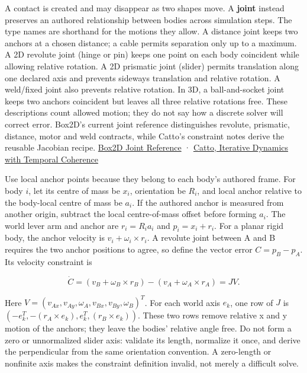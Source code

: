A contact is created and may disappear as two shapes move. A \textbf{joint} instead preserves an authored relationship between bodies across simulation steps. The type names are shorthand for the motions they allow. A distance joint keeps two anchors at a chosen distance; a cable permits separation only up to a maximum. A 2D revolute joint (hinge or pin) keeps one point on each body coincident while allowing relative rotation. A 2D prismatic joint (slider) permits translation along one declared axis and prevents sideways translation and relative rotation. A weld/fixed joint also prevents relative rotation. In 3D, a ball-and-socket joint keeps two anchors coincident but leaves all three relative rotations free. These descriptions count allowed motion; they do not say how a discrete solver will correct error. Box2D's current joint reference distinguishes revolute, prismatic, distance, motor and weld contracts, while Catto's constraint notes derive the reusable Jacobian recipe. \href{https://box2d.org/documentation/group__joint.html}{Box2D Joint Reference} · \href{https://box2d.org/files/ErinCatto_IterativeDynamicsSlides_GDC2005.pdf}{Catto, Iterative Dynamics with Temporal Coherence}

Use local anchor points because they belong to each body's authored frame. For body \(i\), let its centre of mass be \(x_i\), orientation be \(R_i\), and local anchor relative to the body-local centre of mass be \(a_i\). If the authored anchor is measured from another origin, subtract the local centre-of-mass offset before forming \(a_i\). The world lever arm and anchor are \(r_i=R_i a_i\) and \(p_i=x_i+r_i\). For a planar rigid body, the anchor velocity is \(v_i+\omega_i\times r_i\). A revolute joint between A and B requires the two anchor positions to agree, so define the vector error \(C=p_B-p_A\). Its velocity constraint is

\[
\dot C=(v_B+\omega_B\times r_B)-(v_A+\omega_A\times r_A)=JV.
\]

Here \(V=(v_{Ax},v_{Ay},\omega_A,v_{Bx},v_{By},\omega_B)^T\). For each world axis \(e_k\), one row of \(J\) is \((-e_k^T,-(r_A\times e_k),e_k^T,(r_B\times e_k))\). These two rows remove relative x and y motion of the anchors; they leave the bodies' relative angle free. Do not form a zero or unnormalized slider axis: validate its length, normalize it once, and derive the perpendicular from the same orientation convention. A zero-length or nonfinite axis makes the constraint definition invalid, not merely a difficult solve.

